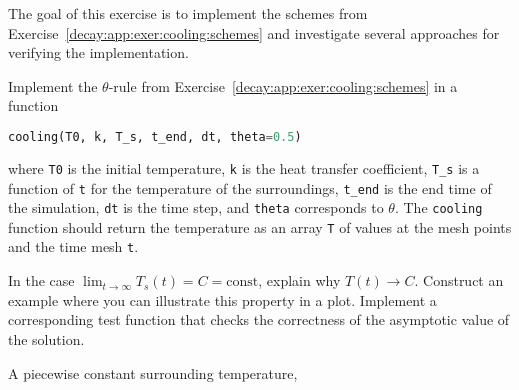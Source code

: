 \documentclass[graybox,sectrefs,envcountresetchap,open=right,final]{svmonodo}
\makeatletter
\newenvironment{doconceexercise}{}{}
\newcounter{doconceexercisecounter}%
\newcommand\listofexercises{
\chapter*{List of Exercises, Problems, and Projects
          \@mkboth{List of Exercises, Problems, and Projects}{List of Exercises, Problems, and Projects}}
\markboth{List of Exercises, Problems, and Projects}{List of Exercises, Problems, and Projects}
\@starttoc{loe}
}
\makeatother
\begin{document}
\begin{doconceexercise}

                
\label{decay:app:exer:cooling:py}

The goal of this exercise is to implement the schemes from
Exercise~\ref{decay:app:exer:cooling:schemes} and investigate
several approaches for verifying the implementation.

Implement the $\theta$-rule from
Exercise~\ref{decay:app:exer:cooling:schemes} in a function



\begin{lstlisting}[language=Python,style=gray]
cooling(T0, k, T_s, t_end, dt, theta=0.5)

\end{lstlisting}

where \texttt{T0} is the initial temperature, \texttt{k} is
the heat transfer coefficient, \Verb!T_s! is a function of \texttt{t} for
the temperature of the
surroundings, \Verb!t_end! is the end time of the simulation, \texttt{dt} is the
time step, and \texttt{theta} corresponds to $\theta$.  The \texttt{cooling}
function should return the temperature as an array \texttt{T} of values at
the mesh points and the time mesh \texttt{t}.



In the case $\lim_{t\rightarrow\infty}T_s(t)=C=\mbox{const}$,
explain why $T(t)\rightarrow C$. Construct an example where you
can illustrate this property in a plot. Implement a corresponding
test function that checks the correctness of the asymptotic
value of the solution.



A piecewise constant surrounding temperature,


\end{doconceexercise}
\end{document}
